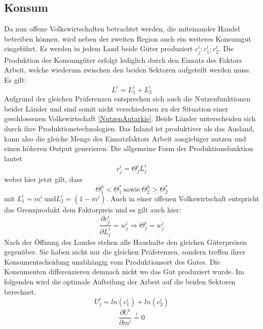 \subsection{Konsum}
Da nun offene Volkswirtschaften betrachtet werden, die miteinander Handel betreiben k{\"o}nnen, wird neben der zweiten Region auch ein weiteres Konsumgut eingef{\"u}hrt. Es werden in jedem Land beide G{\"u}ter produziert $c^i_j: c^i_1; c^i_2$. Die Produktion der Konsumg{\"u}ter erfolgt lediglich durch den Einsatz des Faktors Arbeit, welche wiederum zwischen den beiden Sektoren aufgeteilt werden muss. Es gilt:
\begin{displaymath}L^i=L^i_1+L^i_2\end{displaymath}
Aufgrund der gleichen Pr{\"a}ferenzen entsprechen sich auch die Nutzenfunktionen beider L{\"a}nder und sind somit nicht verschiedenen zu der Situation einer geschlossenen Volkswirtschaft \eqref{NutzenAutarkie}.\newline 
Beide L{\"a}nder unterscheiden sich durch ihre Produktionstechnologien. Das Inland ist produktiver als das Ausland, kann also die gleiche Menge des Einsatzfaktors Arbeit ausgiebiger nutzen und einen h{\"o}heren Output generieren. Die allgemeine Form der Produktionsfunktion  lautet
\begin{displaymath}c^i_j=\Theta^i_jL^i_j \end{displaymath} 
wobei hier jetzt gilt, dass 
\begin{equation}\Theta_1^h<\Theta_1^*~\text{sowie}~\Theta_2^h>\Theta_2^*\end{equation} mit $L_1^i=m ^i  ~\text{und} L_2^i=(1-m^i)$.\newline 
Auch in einer offenen Volkswirtschaft entspricht das Grenzprodukt dem Faktorpreis und es gilt auch hier: 
\begin{displaymath}\frac{\partial c^i_j}{\partial L^i_j}=w^i_j \Rightarrow \Theta^i_j=w^i_j\end{displaymath}
Nach der {\"O}ffnung des Landes stehen alle Haushalte den gleichen G{\"u}terpreisen gegen{\"u}ber. Sie haben nicht nur die gleichen Pr{\"a}ferenzen, sondern treffen ihrer Konsumentscheidung unabh{\"a}ngig vom Produktionsort des Gutes. Die Konsumenten differenzieren demnach nicht wo das Gut produziert wurde. \newline 
Im folgenden wird die optimale Aufteilung der Arbeit auf die beiden Sektoren berechnet. \begin{equation} U^i_j=ln(c^i_1)+ln(c^i_2)\label{NutzenTrade}\end{equation}
\begin{equation}\frac{\partial U^i}{\partial m^i}\overset{!}{=}0\end{equation}
